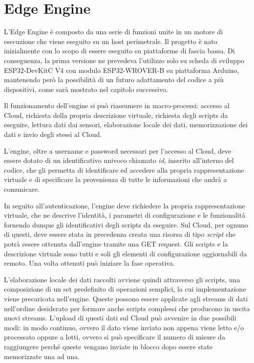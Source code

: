 \section{Edge Engine}
L'Edge Engine è composto da una serie di funzioni unite in un motore di esecuzione che viene eseguito su un host perimetrale. Il progetto è nato inizialmente con lo scopo di essere eseguito su piattaforme di fascia bassa. Di conseguenza, la prima versione ne prevedeva l’utilizzo solo su scheda di sviluppo ESP32-DevKitC V4 con modulo ESP32-WROVER-B su piattaforma Arduino, mantenendo però la possibilità di un futuro adattamento del codice a più dispositivi, come sarà mostrato nel capitolo successivo.

Il funzionamento dell'engine si può riassumere in macro-processi: accesso al Cloud, richiesta della propria descrizione virtuale, richiesta degli scripts da eseguire, lettura dati dai sensori, elaborazione locale dei dati, memorizzazione dei dati e invio degli stessi al Cloud.

L’engine, oltre a username e password necessari per l’accesso al Cloud, deve essere dotato di un identificativo univoco chiamato \textit{id}, inserito all'interno del codice, che gli permetta di identificare ed accedere alla propria rappresentazione virtuale e di specificare la provenienza di tutte le informazioni che andrà a comunicare.

In seguito all'autenticazione, l'engine deve richiedere la propria rappresentazione virtuale, che ne descrive l'identità, i parametri di configurazione e le funzionalità fornendo dunque gli identificativi degli scripts da eseguire. Sul Cloud, per ognuno di questi, deve essere stata in precedenza creata una risorsa di tipo \textit{script} che potrà essere ottenuta dall’engine tramite una GET request. Gli scripts e la descrizione virtuale sono tutti e soli gli elementi di configurazione aggiornabili da remoto. Una volta ottenuti può iniziare la fase operativa.

L’elaborazione locale dei dati raccolti avviene quindi attraverso gli scripts, una composizione di un set predefinito di operazioni semplici, la cui implementazione viene precaricata nell'engine. Queste possono essere applicate agli streams di dati nell'ordine desiderato per formare anche scripts complessi che producono in uscita nuovi streams. L'upload di questi dati sul Cloud può avvenire in due possibili modi: in modo continuo, ovvero il dato viene inviato non appena viene letto e/o processato oppure a lotti, ovvero si può specificare il numero di misure da raggiungere perché queste vengano inviate in blocco dopo essere state memorizzate una ad una.

